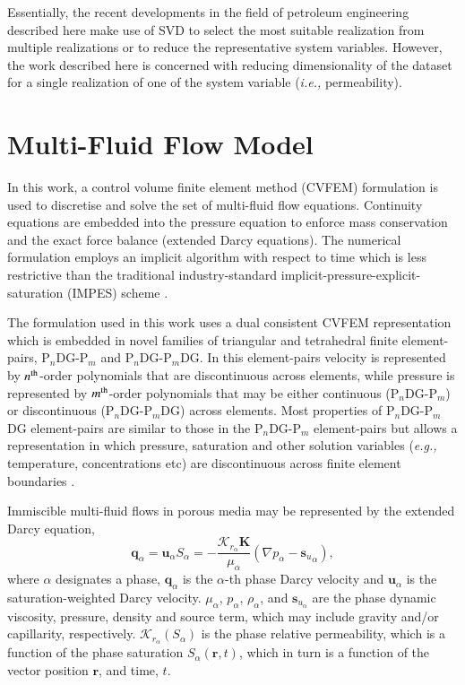 \documentclass[preprint,12pt]{elsarticle}
\newcommand{\PN}[2][error]{P$_{#1}$DG-P$_{#2}$}
\newcommand{\PNDG}[2][error]{P$_{#1}$DG-P$_{#2}$DG}
\newcommand{\eg}{{\it e.g., }}
\newcommand{\ie}{{\it i.e., }}
\begin{document}
Essentially, the recent developments in the field of petroleum engineering described here make use of SVD to select the most suitable realization from multiple realizations or to reduce the representative system variables. However, the work described here is concerned with reducing dimensionality of the dataset for a single realization of one of the system variable (\ie{permeability}).


\section{Multi-Fluid Flow Model}\label{section:mathematical_model}

In this work, a control volume finite element method (CVFEM) formulation is used to discretise and solve the set of multi-fluid flow equations. Continuity equations are embedded into the pressure equation to enforce mass conservation and the exact force balance (extended Darcy equations). The numerical formulation employs an implicit algorithm with respect to time which is less restrictive than the traditional industry-standard implicit-pressure-explicit-saturation (IMPES) scheme \cite{aziz_1986,geiger_2004}.

The formulation used in this work uses a dual consistent CVFEM representation which is embedded in novel families of triangular and tetrahedral finite element-pairs, \PN[n]{m} and \PNDG[n]{m}. In this element-pairs velocity is represented by $n^{\rm th}$-order polynomials that are discontinuous across elements, while pressure is represented by $m^{\rm th}$-order polynomials that may be either continuous (\PN[n]{m}) or discontinuous (\PNDG[n]{m}) across elements. Most properties of \PNDG[n]{m} element-pairs are similar to those in the \PN[n]{m} element-pairs but allows a representation in which pressure, saturation and other solution variables (\eg temperature, concentrations etc) are discontinuous across finite element boundaries \cite{salinas_2018,adam_2016}.

Immiscible multi-fluid flows in porous media may be represented by the extended Darcy equation,
\begin{equation}\label{e:darcy_eqn}
  \mathbf{q}_{\alpha} = \mathbf{u}_{\alpha}S_\alpha=
  -\frac{\mathcal{K}_{{r}_\alpha}\mathbf{K}}{\mu_{\alpha}}\left(
  \nabla p_{\alpha} - {\mathbf{s}_{u}}_{\alpha} \right),
\end{equation}
where $\alpha$ designates a phase, $\mathbf{q}_{\alpha}$ is the $\alpha$-th phase Darcy velocity and $\mathbf{u}_{\alpha}$ is the saturation-weighted Darcy velocity. $\mu_{\alpha}$, $p_{\alpha}$, $\rho_{\alpha}$, and $\mathbf{s}_{{u}_\alpha}$ are the phase dynamic viscosity, pressure, density and source term, which may include gravity and/or capillarity, respectively. $\mathcal{K}_{{r}_\alpha}\left(S_{\alpha}\right)$ is the phase relative permeability, which is a function of the phase saturation $S_{\alpha}\left(\mathbf{r},t\right)$, which in turn is a function of the vector position $\mathbf{r}$, and time, $t$.
\end{document}

